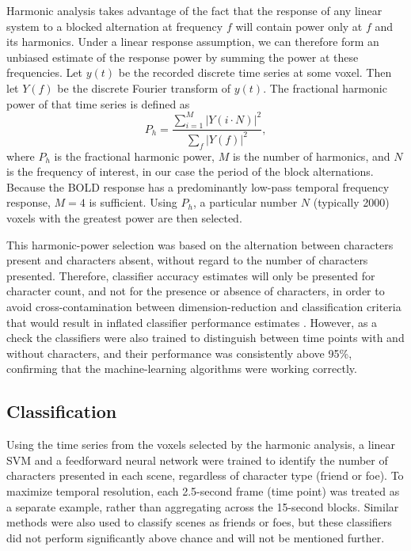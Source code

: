 \documentclass[review,1p,authoryear]{elsarticle}
\begin{document}
Harmonic analysis takes advantage of the fact that the response of any linear system to a blocked alternation at frequency $f$ will contain power only at $f$ and its harmonics. 
Under a linear response assumption, we can therefore form an unbiased estimate of the response power by summing the power at these frequencies. 
Let $y(t)$ be the recorded discrete time series at some voxel.
Then let $Y(f)$ be the discrete Fourier transform of $y(t)$.
The fractional harmonic power of that time series is defined as
\begin{equation}
P_h = \frac{\sum_{i = 1}^{M}{\left|Y(i \cdot N)\right|^{2}}}{\sum_{f}{\left|Y(f)\right|^{2}}},
\end{equation}
where $P_h$ is the fractional harmonic power, $M$ is the number of harmonics, and $N$ is the frequency of interest, in our case the period of the block alternations. 
Because the BOLD response has a predominantly low-pass temporal frequency response, $M = 4$ is sufficient. 
Using $P_h$, a particular number $N$ (typically 2000) voxels with the greatest power are then selected. 

This harmonic-power selection was based on the alternation between characters present and characters absent, without regard to the number of characters presented. 
Therefore, classifier accuracy estimates will only be presented for character count, and not for the presence or absence of characters, in order to avoid cross-contamination between dimension-reduction and  classification criteria that would result in inflated classifier performance estimates \citep{Pereira2009}.
However, as a check the classifiers were also trained to distinguish between time points with and without characters, and their performance was consistently above 95\%, confirming that the machine-learning algorithms were working correctly.

\subsection{Classification}
Using the time series from the voxels selected by the harmonic analysis, a linear SVM \citep{Cortes1995} and a feedforward neural network \citep{Hornik1989,Hagan1994} were trained to identify the number of characters presented in each scene, regardless of character type (friend or foe).
To maximize temporal resolution, each 2.5-second frame (time point) was treated as a separate example, rather than aggregating across the 15-second blocks.
Similar methods were also used to classify scenes as friends or foes, but these classifiers did not perform significantly above chance and will not be mentioned further.
\end{document}
